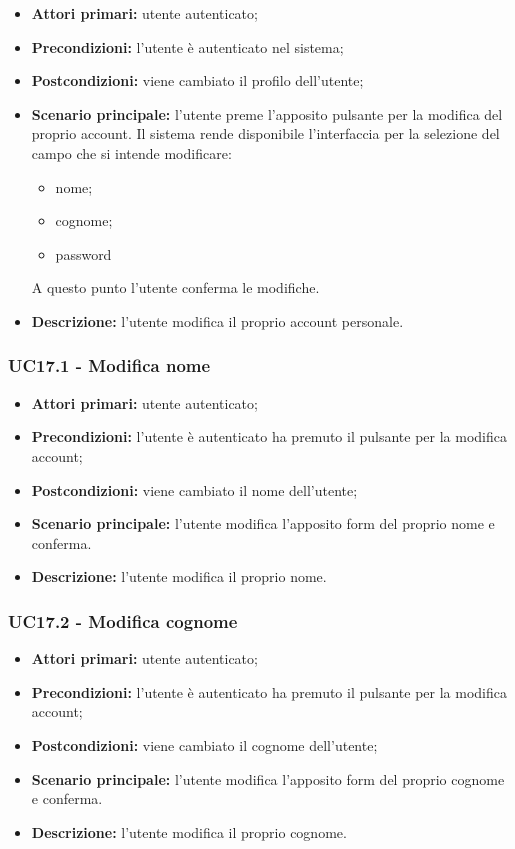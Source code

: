 \begin{itemize}
	\item 	\textbf{Attori primari:} utente autenticato;
	\item 	\textbf{Precondizioni:} l'utente è autenticato nel sistema;
	\item 	\textbf{Postcondizioni:} viene cambiato il profilo dell'utente;
	\item 	\textbf{Scenario principale:} l'utente preme l'apposito pulsante per la modifica del proprio account. Il sistema rende disponibile l'interfaccia per la selezione del campo che si intende modificare:
	\begin{itemize}
		\item nome;
		\item cognome;
		\item password
	\end{itemize}
	A questo punto l'utente conferma le modifiche.
	\item 	\textbf{Descrizione:} l'utente modifica il proprio account personale.
\end{itemize}

\subsubsection{UC17.1 - Modifica nome}
\begin{itemize}
	\item 	\textbf{Attori primari:} utente autenticato;
	\item 	\textbf{Precondizioni:} l'utente è autenticato ha premuto il pulsante per la modifica account;
	\item 	\textbf{Postcondizioni:} viene cambiato il nome dell'utente;
	\item 	\textbf{Scenario principale:} l'utente modifica l'apposito form del proprio nome e conferma.
	\item 	\textbf{Descrizione:} l'utente modifica il proprio nome.
\end{itemize}

\subsubsection{UC17.2 - Modifica cognome}
\begin{itemize}
	\item 	\textbf{Attori primari:} utente autenticato;
	\item 	\textbf{Precondizioni:} l'utente è autenticato ha premuto il pulsante per la modifica account;
	\item 	\textbf{Postcondizioni:} viene cambiato il cognome dell'utente;
	\item 	\textbf{Scenario principale:} l'utente modifica l'apposito form del proprio cognome e conferma.
	\item 	\textbf{Descrizione:} l'utente modifica il proprio cognome.
\end{itemize}

